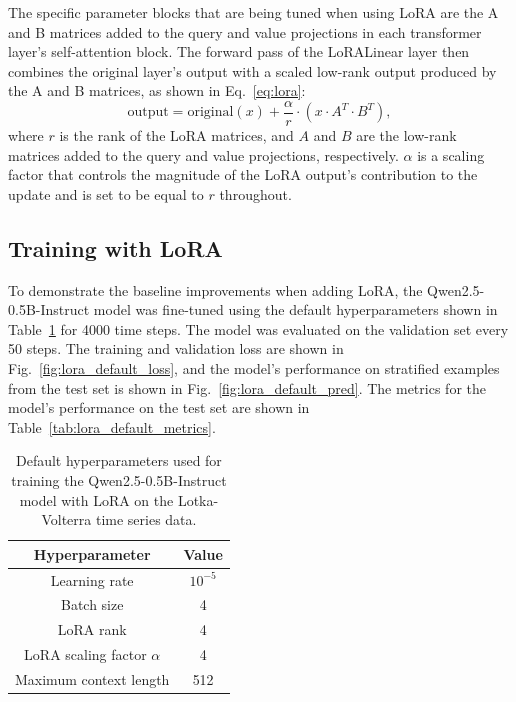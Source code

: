 \documentclass[11pt,a4paper]{article}
\begin{document}
The specific parameter blocks that are being tuned when using LoRA are the A and B matrices added to the query and value projections in each transformer layer's self-attention block. The forward pass of the LoRALinear layer then combines the original layer's output with a scaled low-rank output produced by the A and B matrices, as shown in Eq.~\ref{eq:lora}:
\begin{equation}
    \mathrm{output} = \mathrm{original}(x) + \frac{\alpha}{r} \cdot (x \cdot A^T \cdot B^T),
    \label{eq:lora}
\end{equation}
where $r$ is the rank of the LoRA matrices, and $A$ and $B$ are the low-rank matrices added to the query and value projections, respectively. $\alpha$ is a scaling factor that controls the magnitude of the LoRA output's contribution to the update and is set to be equal to $r$ throughout.

\subsection{Training with LoRA}
To demonstrate the baseline improvements when adding LoRA, the Qwen2.5-0.5B-Instruct model was fine-tuned using the default hyperparameters shown in Table~\ref{tab:lora_default} for 4000 time steps. The model was evaluated on the validation set every 50 steps. The training and validation loss are shown in Fig.~\ref{fig:lora_default_loss}, and the model's performance on stratified examples from the test set is shown in Fig.~\ref{fig:lora_default_pred}. The metrics for the model's performance on the test set are shown in Table~\ref{tab:lora_default_metrics}.

\begin{table}[h]
    \centering
    \begin{tabular}{c|c}
        Hyperparameter & Value \\
        \hline
        Learning rate & $10^{-5}$ \\
        Batch size & 4 \\
        LoRA rank & 4 \\
        LoRA scaling factor $\alpha$ & 4 \\
        Maximum context length & 512 \\
    \end{tabular}
    \caption{Default hyperparameters used for training the Qwen2.5-0.5B-Instruct model with LoRA on the Lotka-Volterra time series data.}
    \label{tab:lora_default}
\end{table}
\end{document}
